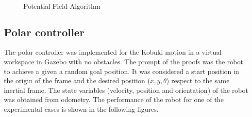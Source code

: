 \documentclass[conference]{IEEEtran}
\begin{document}
\begin{figure}[ht!]
	\centering
	~\\
	\caption{Potential Field Algorithm} \label{f:apf}
\end{figure}

\subsection{Polar controller}

The polar controller was implemented for the Kobuki motion in a virtual workspace in Gazebo with no obstacles. The prompt of the proofs was the robot to achieve a given a random goal position.  It was considered a start position in the origin of the frame and the desired position ($x,y,\theta$) respect to the same inertial frame. The state variables (velocity, position and orientation) of the robot was obtained from odometry. The performance of the robot for one of the experimental cases is shown in the following figures.
\end{document}
